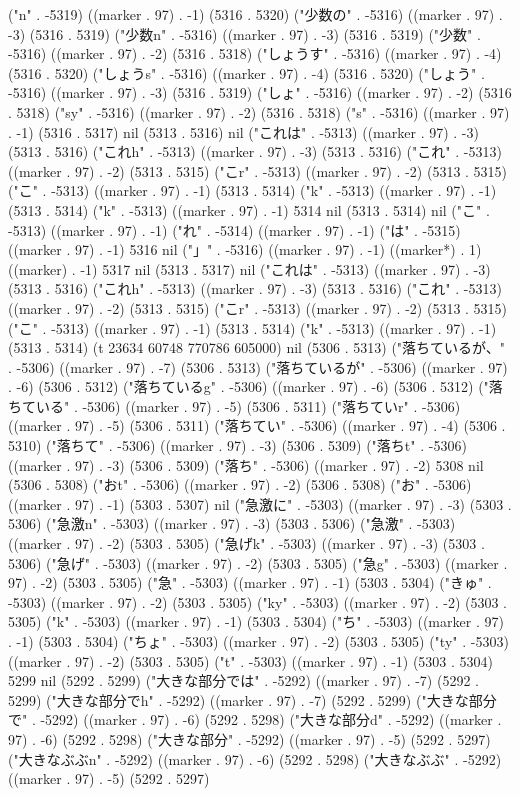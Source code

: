 ("n" . -5319) ((marker . 97) . -1) (5316 . 5320) ("少数の" . -5316) ((marker . 97) . -3) (5316 . 5319) ("少数n" . -5316) ((marker . 97) . -3) (5316 . 5319) ("少数" . -5316) ((marker . 97) . -2) (5316 . 5318) ("しょうす" . -5316) ((marker . 97) . -4) (5316 . 5320) ("しょうs" . -5316) ((marker . 97) . -4) (5316 . 5320) ("しょう" . -5316) ((marker . 97) . -3) (5316 . 5319) ("しょ" . -5316) ((marker . 97) . -2) (5316 . 5318) ("sy" . -5316) ((marker . 97) . -2) (5316 . 5318) ("s" . -5316) ((marker . 97) . -1) (5316 . 5317) nil (5313 . 5316) nil ("これは" . -5313) ((marker . 97) . -3) (5313 . 5316) ("これh" . -5313) ((marker . 97) . -3) (5313 . 5316) ("これ" . -5313) ((marker . 97) . -2) (5313 . 5315) ("こr" . -5313) ((marker . 97) . -2) (5313 . 5315) ("こ" . -5313) ((marker . 97) . -1) (5313 . 5314) ("k" . -5313) ((marker . 97) . -1) (5313 . 5314) ("k" . -5313) ((marker . 97) . -1) 5314 nil (5313 . 5314) nil ("こ" . -5313) ((marker . 97) . -1) ("れ" . -5314) ((marker . 97) . -1) ("は" . -5315) ((marker . 97) . -1) 5316 nil ("」" . -5316) ((marker . 97) . -1) ((marker*) . 1) ((marker) . -1) 5317 nil (5313 . 5317) nil ("これは" . -5313) ((marker . 97) . -3) (5313 . 5316) ("これh" . -5313) ((marker . 97) . -3) (5313 . 5316) ("これ" . -5313) ((marker . 97) . -2) (5313 . 5315) ("こr" . -5313) ((marker . 97) . -2) (5313 . 5315) ("こ" . -5313) ((marker . 97) . -1) (5313 . 5314) ("k" . -5313) ((marker . 97) . -1) (5313 . 5314) (t 23634 60748 770786 605000) nil (5306 . 5313) ("落ちているが、" . -5306) ((marker . 97) . -7) (5306 . 5313) ("落ちているが" . -5306) ((marker . 97) . -6) (5306 . 5312) ("落ちているg" . -5306) ((marker . 97) . -6) (5306 . 5312) ("落ちている" . -5306) ((marker . 97) . -5) (5306 . 5311) ("落ちていr" . -5306) ((marker . 97) . -5) (5306 . 5311) ("落ちてい" . -5306) ((marker . 97) . -4) (5306 . 5310) ("落ちて" . -5306) ((marker . 97) . -3) (5306 . 5309) ("落ちt" . -5306) ((marker . 97) . -3) (5306 . 5309) ("落ち" . -5306) ((marker . 97) . -2) 5308 nil (5306 . 5308) ("おt" . -5306) ((marker . 97) . -2) (5306 . 5308) ("お" . -5306) ((marker . 97) . -1) (5303 . 5307) nil ("急激に" . -5303) ((marker . 97) . -3) (5303 . 5306) ("急激n" . -5303) ((marker . 97) . -3) (5303 . 5306) ("急激" . -5303) ((marker . 97) . -2) (5303 . 5305) ("急げk" . -5303) ((marker . 97) . -3) (5303 . 5306) ("急げ" . -5303) ((marker . 97) . -2) (5303 . 5305) ("急g" . -5303) ((marker . 97) . -2) (5303 . 5305) ("急" . -5303) ((marker . 97) . -1) (5303 . 5304) ("きゅ" . -5303) ((marker . 97) . -2) (5303 . 5305) ("ky" . -5303) ((marker . 97) . -2) (5303 . 5305) ("k" . -5303) ((marker . 97) . -1) (5303 . 5304) ("ち" . -5303) ((marker . 97) . -1) (5303 . 5304) ("ちょ" . -5303) ((marker . 97) . -2) (5303 . 5305) ("ty" . -5303) ((marker . 97) . -2) (5303 . 5305) ("t" . -5303) ((marker . 97) . -1) (5303 . 5304) 5299 nil (5292 . 5299) ("大きな部分では" . -5292) ((marker . 97) . -7) (5292 . 5299) ("大きな部分でh" . -5292) ((marker . 97) . -7) (5292 . 5299) ("大きな部分で" . -5292) ((marker . 97) . -6) (5292 . 5298) ("大きな部分d" . -5292) ((marker . 97) . -6) (5292 . 5298) ("大きな部分" . -5292) ((marker . 97) . -5) (5292 . 5297) ("大きなぶぶn" . -5292) ((marker . 97) . -6) (5292 . 5298) ("大きなぶぶ" . -5292) ((marker . 97) . -5) (5292 . 5297) 